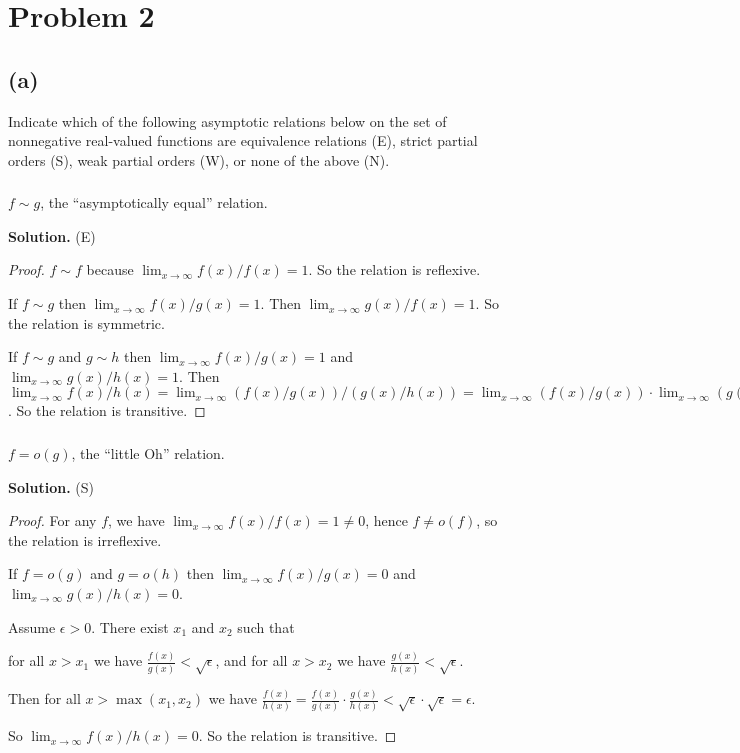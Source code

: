\documentclass[14pt]{extarticle}
\newcommand{\dps}{\displaystyle}
\begin{document}
\section{Problem 2}
\subsection{(a)}
Indicate which of the following asymptotic relations below on the set of nonnegative real-valued functions are equivalence relations (E), strict partial orders (S), weak partial orders (W), or none of the above (N).

\subsubsection{}
$f \sim g$, the ``asymptotically equal'' relation.

{\bf Solution.} (E)

\begin{proof}
$f \sim f$ because $\dps\lim_{x\to\infty}f(x)/f(x) = 1$. So the relation is reflexive.

If $f \sim g$ then $\dps\lim_{x\to\infty}f(x)/g(x) = 1$. Then $\dps\lim_{x\to\infty}g(x)/f(x) = 1$. So the relation is symmetric.

If $f \sim g$ and $g \sim h$ then $\dps\lim_{x\to\infty}f(x)/g(x) = 1$ and $\dps\lim_{x\to\infty}g(x)/h(x) = 1$. Then $\dps\lim_{x\to\infty}f(x)/h(x) =\lim_{x\to\infty} (f(x)/g(x))/(g(x)/h(x)) = \lim_{x\to\infty} (f(x)/g(x)) \cdot \lim_{x\to\infty} (g(x)/h(x)) = 1/1 = 1$. So the relation is transitive.
\end{proof}

\subsubsection{}
$f = o(g)$, the ``little Oh'' relation.

{\bf Solution.} (S)

\begin{proof}
For any $f$, we have $\dps\lim_{x\to\infty}f(x)/f(x) = 1 \neq 0$, hence $f \neq o(f)$, so the relation is irreflexive.

If $f = o(g)$ and $g = o(h)$ then $\dps\lim_{x\to\infty}f(x)/g(x) = 0$ and $\dps\lim_{x\to\infty}g(x)/h(x) = 0$.

Assume $\epsilon > 0$. There exist $x_1$ and $x_2$ such that

for all $x > x_1$ we have $\dps\frac{f(x)}{g(x)} < \sqrt{\epsilon}$, and for all $x > x_2$ we have $\dps\frac{g(x)}{h(x)} < \sqrt{\epsilon}$. 

Then for all $x > \max(x_1, x_2)$ we have $\dps \frac{f(x)}{h(x)} = \frac{f(x)}{g(x)} \cdot \frac{g(x)}{h(x)} < \sqrt{\epsilon} \cdot \sqrt{\epsilon} = \epsilon$.

So $\dps\lim_{x\to\infty}f(x)/h(x) = 0$. So the relation is transitive.
\end{proof}
\end{document}
